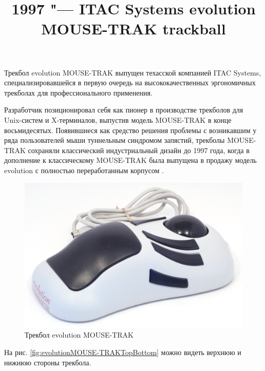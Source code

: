 \documentclass[11pt, a4paper]{article}
\begin{document}
\title{1997 "--- ITAC Systems evolution MOUSE-TRAK trackball}
\date{}
\maketitle
{}
Трекбол evolution MOUSE-TRAK выпущен техасской компанией ITAC Systems, специализировавшейся в первую очередь на высококачественных эргономичных трекболах для профессионального применения.

Разработчик позиционировал себя как пионер в производстве трекболов для Unix-систем и X-терминалов, выпустив модель MOUSE-TRAK в конце восьмидесятых. Появившиеся как средство решения проблемы с возникавшим у ряда пользователей мыши туннельным синдромом запястий, трекболы MOUSE-TRAK сохраняли классический индустриальный дизайн до 1997 года, когда в дополнение к классическому MOUSE-TRAK была выпущена в продажу модель evolution с полностью переработанным корпусом \cite{announcement, description}.

\begin{figure}[h]
    \centering
    \includegraphics[scale=0.3]{1997_mousetrak_evolution/pic_30.jpg}
    \caption{Трекбол evolution MOUSE-TRAK}
    \label{fig:evolutionMOUSE-TRAK}
\end{figure}

На рис. \ref{fig:evolutionMOUSE-TRAKTopBottom} можно видеть верхнюю и нижнюю стороны трекбола.
\end{document}
